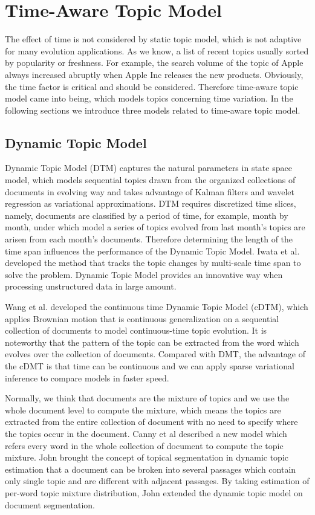 \section{Time-Aware Topic Model}

The effect of time is not considered by static topic model, which is not adaptive for many evolution applications. As we know, a list of recent topics usually sorted by popularity or freshness.  For example, the search volume of the topic of Apple always increased abruptly when Apple Inc releases the new products. Obviously, the time factor is critical and should be considered. Therefore time-aware topic model came into being, which models topics concerning time variation. In the following sections we introduce three models related to time-aware topic model.

\subsection{Dynamic Topic Model}

Dynamic Topic Model (DTM) \cite{blei2006dynamic} captures the natural parameters in state space model, which models sequential topics drawn from the organized collections of documents in evolving way and takes advantage of Kalman filters and wavelet regression as variational approximations. DTM requires discretized time slices, namely, documents are classified by a period of time, for example, month by month, under which model a series of topics evolved from last month’s topics are arisen from each month’s documents. Therefore determining the length of the time span influences the performance of the Dynamic Topic Model. Iwata et al. \cite{iwata2009topic} developed the method that tracks the topic changes by multi-scale time span to solve the problem. Dynamic Topic Model provides an innovative way when processing unstructured data in large amount.

Wang et al. \cite{wang2012continuous} developed the continuous time Dynamic Topic Model (cDTM), which applies Brownian motion that is continuous generalization on a sequential collection of documents to model continuous-time topic evolution. It is noteworthy that the pattern of the topic can be extracted from the word which evolves over the collection of documents. Compared with DMT, the advantage of the cDMT is that time can be continuous and we can apply sparse variational inference to compare models in faster speed. 

Normally, we think that documents are the mixture of topics and we use the whole document level to compute the mixture, which means the topics are extracted from the entire collection of document with no need to specify where the topics occur in the document. Canny et al \cite{canny2006dynamic} described a new model which refers every word in the whole collection of document to compute the topic mixture. John brought the concept of topical segmentation in dynamic topic estimation that a document can be broken into several passages which contain only single topic and are different with adjacent passages. By taking estimation of per-word topic mixture distribution, John extended the dynamic topic model on document segmentation.

